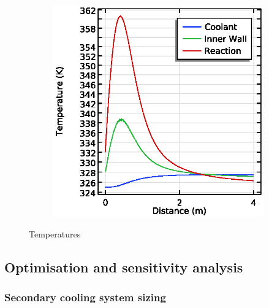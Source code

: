 \begin{figure}[h]
\begin{subfigure}{0.49\linewidth}
        \includegraphics[width=\linewidth]{figures/temperature-lines.eps}
        \caption{}
        \label{fig:comsol-temperature:lines}
    \end{subfigure}

    \caption{Temperatures}
    \label{fig:comsol-temperature}
\end{figure}

\subsection{Optimisation and sensitivity analysis}

\subsubsection{Secondary cooling system sizing}

